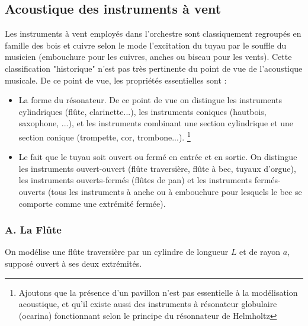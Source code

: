  
  
 \subsection{Acoustique des instruments à vent}

Les instruments à vent employés dans l'orchestre sont classiquement regroupés en famille des bois et cuivre selon le mode l'excitation du tuyau par le souffle du musicien (embouchure pour les cuivres, anches ou biseau pour les vents). Cette classification "historique" n'est pas très pertinente 
du point de vue de l'acoustique musicale. De ce point de vue, les propriétés essentielles sont :

\begin{itemize}

\item La forme du résonateur. De ce point de vue on distingue les instruments cylindriques (flûte, clarinette...), les instruments coniques (hautbois, saxophone, ...), et les instruments combinant une section cylindrique et une section conique (trompette, cor, trombone...). 
\footnote{Ajoutons que la présence d'un pavillon n'est pas essentielle à la modélisation acoustique, et qu'il existe aussi des instruments à résonateur globulaire (ocarina) fonctionnant selon le principe du résonnateur de Helmholtz} 

\item Le fait que le tuyau soit ouvert ou fermé en entrée et en sortie. On distingue les instruments ouvert-ouvert (flûte traversière, flûte à bec, tuyaux d'orgue), les instruments ouverts-fermés 
(flûtes de pan) et les instruments fermés-ouverts (tous les instruments à anche ou à embouchure pour lesquels le bec se comporte comme une extrémité fermée).

\end{itemize}

\subsubsection*{A. La Flûte}

On modélise une flûte traversière par un cylindre de longueur $L$ et de rayon $a$, supposé ouvert à ses deux extrémités.

